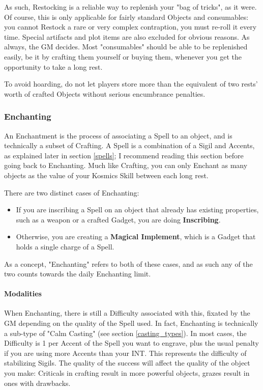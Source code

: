 As such, Restocking is a reliable way to replenish your "bag of tricks", as it were. Of course, this is only applicable for fairly standard Objects and consumables: you cannot Restock a rare or very complex contraption, you must re-roll it every time. Special artifacts and plot items are also excluded for obvious reasons. As always, the GM decides. Most "consumables" should be able to be replenished easily, be it by crafting them yourself or buying them, whenever you get the opportunity to take a long rest. 

To avoid hoarding, do not let players store more than the equivalent of two rests' worth of crafted Objects without serious encumbrance penalties.



\subsubsection{Enchanting}


\label{enchanting}

An Enchantment is the process of associating a Spell to an object, and is technically a subset of Crafting. A Spell is a combination of a Sigil and Accents, as explained later in section \ref{spells}; I recommend reading this section before going back to Enchanting. Much like Crafting, you can only Enchant as many objects as the value of your Kosmics Skill between each long rest.

There are two distinct cases of Enchanting:
\begin{itemize}
	\item If you are inscribing a Spell on an object that already has existing properties, such as a weapon or a crafted Gadget, you are doing \textbf{Inscribing}.
	\item Otherwise, you are creating a \textbf{Magical Implement}, which is a Gadget that holds a single charge of a Spell.
\end{itemize}
As a concept, "Enchanting" refers to both of these cases, and as such any of the two counts towards the daily Enchanting limit.


\paragraph{Modalities}

When Enchanting, there is still a Difficulty associated with this, fixated by the GM depending on the quality of the Spell used. In fact, Enchanting is technically a sub-type of "Calm Casting" (see section \ref{casting_types}). In most cases, the Difficulty is 1 per Accent of the Spell you want to engrave, plus the usual penalty if you are using more Accents than your INT. This represents the difficulty of stabilizing Sigils. The quality of the success will affect the quality of the object you make: Criticals in crafting result in more powerful objects, grazes result in ones with drawbacks.

